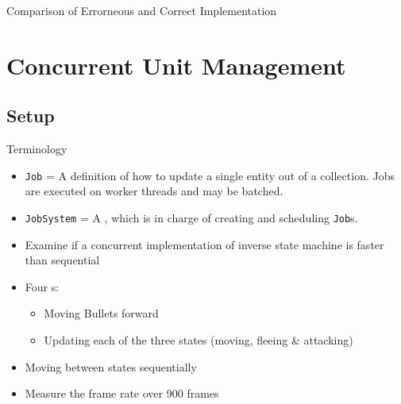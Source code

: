 \begin{frame}[fragile]{\secname}{\subsecname}
	Comparison of Errorneous and Correct Implementation
\end{frame}

\section{Concurrent Unit Management}
\subsection{Setup}
\begin{frame}{\secname}{\subsecname}
	Terminology
	\begin{itemize}
		\item<1-> \texttt{Job} = A definition of how to update a single entity out of a collection. Jobs are executed on worker threads and may be batched.
		\item<2-> \texttt{JobSystem} = A , which is in charge of creating and scheduling \texttt{Job}s.
	\end{itemize}
\end{frame}

\begin{frame}{\secname}{\subsecname}
	\begin{itemize}
		\item<1-> Examine if a concurrent implementation of inverse state machine is faster than sequential
		\item<2-> Four s:
		\begin{itemize}
			\item Moving Bullets forward
			\item Updating each of the three states (moving, fleeing \& attacking)
		\end{itemize}
		\item<3-> Moving between states sequentially
		\item<4-> Measure the frame rate over 900 frames
	\end{itemize}
\end{frame}

